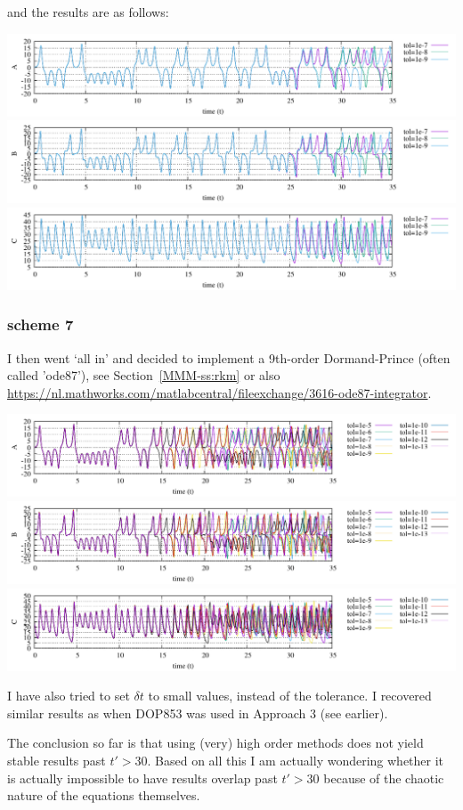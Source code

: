 and the results are as follows:
\begin{center}
\includegraphics[width=16cm]{python_codes/fieldstone_156/results/scheme6/A.pdf}
\includegraphics[width=16cm]{python_codes/fieldstone_156/results/scheme6/B.pdf}
\includegraphics[width=16cm]{python_codes/fieldstone_156/results/scheme6/C.pdf}
\end{center}


\subsubsection*{scheme 7}

I then went `all in' and decided to implement a 9th-order Dormand-Prince (often
called 'ode87'), see Section~\ref{MMM-ss:rkm} or also
\url{https://nl.mathworks.com/matlabcentral/fileexchange/3616-ode87-integrator}.

\begin{center}
\includegraphics[width=16cm]{python_codes/fieldstone_156/results/scheme7/A.pdf}
\includegraphics[width=16cm]{python_codes/fieldstone_156/results/scheme7/B.pdf}
\includegraphics[width=16cm]{python_codes/fieldstone_156/results/scheme7/C.pdf}
\end{center}
I have also tried to set $\delta t$ to small values, instead of the tolerance.
I recovered similar results as when DOP853 was used in Approach 3 (see earlier).

\vspace{1cm}

The conclusion so far is that using (very) high order methods does not 
yield stable results past $t'>30$.
Based on all this I am actually wondering whether it is actually impossible 
to have results overlap past $t'>30$ because of the chaotic nature of the 
equations themselves.


